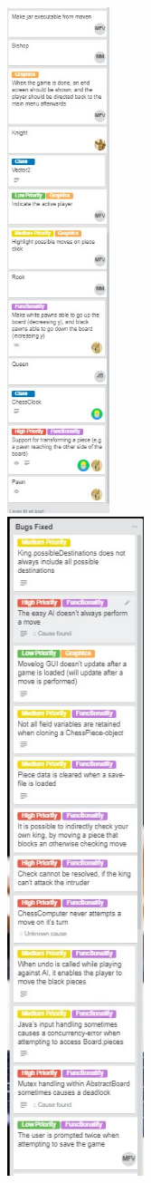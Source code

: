 \documentclass{article}
\begin{document}
\includegraphics[width=3cm]{programmingDone2.jpg}\\
\includegraphics[width=4cm]{bugsFixed1.jpg}
\end{document}
